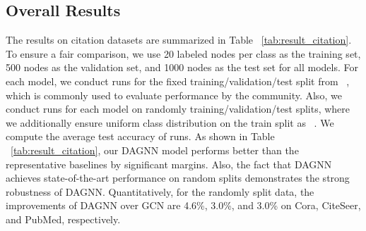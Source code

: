\documentclass[sigconf]{acmart}
\begin{document}
\begin{table*}[t]
\caption{Results with different training set sizes on Cora in terms of classification accuracy (in percent). Results in brackets are the improvements of DAGNN over GCN.}
\label{tab:train_size}
\end{table*}


\subsection{Overall Results}



The results on citation datasets are summarized in Table ~\ref{tab:result_citation}. To ensure a fair comparison, we use 20 labeled nodes per class as the training set, 500 nodes as the validation set, and 1000 nodes as the test set for all models. For each model, we conduct  runs for the fixed training/validation/test split from ~\cite{kipf2016semi}, which is commonly used to evaluate performance by the community. Also, we conduct  runs for each model on randomly training/validation/test splits, where we additionally ensure uniform class distribution on the train split as ~\cite{Fey/Lenssen/2019}. We compute the average test accuracy of  runs. As shown in Table ~\ref{tab:result_citation}, our DAGNN model performs better than the representative baselines by significant margins. Also, the fact that DAGNN achieves state-of-the-art performance on random splits demonstrates the strong robustness of DAGNN. Quantitatively, for the randomly split data, the improvements of DAGNN over GCN are 4.6\%, 3.0\%, and 3.0\% on Cora, CiteSeer, and PubMed, respectively.
\end{document}
